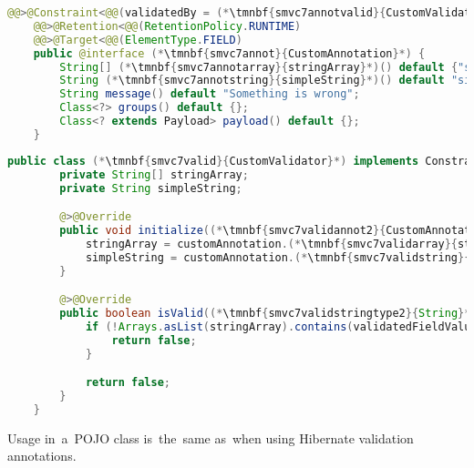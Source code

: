 \example
\begin{lstlisting}[language=Java, title={Custom validation annotation class}]
    @@>@Constraint<@@(validatedBy = (*\tmnbf{smvc7annotvalid}{CustomValidator}*))
    @@>@Retention<@@(RetentionPolicy.RUNTIME)
    @@>@Target<@@(ElementType.FIELD)
    public @interface (*\tmnbf{smvc7annot}{CustomAnnotation}*) {
        String[] (*\tmnbf{smvc7annotarray}{stringArray}*)() default {"simpleArrayMember"};
        String (*\tmnbf{smvc7annotstring}{simpleString}*)() default "simpleStringValue";
        String message() default "Something is wrong";
        Class<?> groups() default {};
        Class<? extends Payload> payload() default {};
    }
\end{lstlisting}
\begin{lstlisting}[language=Java, title={Custom validator class, validated field must contain either a~value from the~array or~must~be equal to~the~simple string}]
    public class (*\tmnbf{smvc7valid}{CustomValidator}*) implements ConstraintValidator<(*\tmnbf{smvc7validannot1}{CustomAnnotation}*), (*\tmnbf{smvc7validstringtype1}{String}*)> {
        private String[] stringArray;
        private String simpleString;

        @>@Override
        public void initialize((*\tmnbf{smvc7validannot2}{CustomAnnotation}*) customAnnotation) {
            stringArray = customAnnotation.(*\tmnbf{smvc7validarray}{stringArray}*)();
            simpleString = customAnnotation.(*\tmnbf{smvc7validstring}{simpleString}*)();
        }

        @>@Override
        public boolean isValid((*\tmnbf{smvc7validstringtype2}{String}*) validatedFieldValue, ConstraintValidatorContext context) {
            if (!Arrays.asList(stringArray).contains(validatedFieldValue) && (!simpleString.equals(validatedFieldValue)) {
                return false;
            }

            return false;
        }
    }
\end{lstlisting}
\noindent Usage in~a~POJO class is~the~same as~when using Hibernate validation annotations.
\newpage

